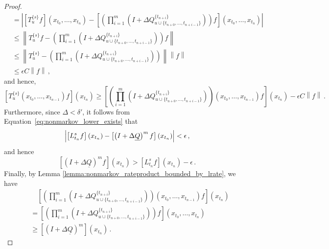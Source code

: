 \documentclass[10pt]{paper}
\newcommand{\lrate}{\underline{Q}}
\newcommand{\norm}[1]{\left\lVert #1 \right\rVert}
\begin{document}
\begin{proof}
\begin{align*}
&= \left\vert \left[T_{u}^{\{s\}}f\right](x_{t_0},\ldots,x_{t_{n}}) - \left[\left(\prod_{i=1}^m\left(I + \Delta Q_{u\cup\{t_{n+0},\ldots,t_{n+i-1}\}}^{\{t_{n+i}\}}\right)\right)f\right](x_{t_0},\ldots,x_{t_{n}})\right\vert \\
&\leq \norm{T_{u}^{\{s\}}f - \left(\prod_{i=1}^m\left(I + \Delta Q_{u\cup\{t_{n+0},\ldots,t_{n+i-1}\}}^{\{t_{n+i}\}}\right)\right)f} \\
&\leq \norm{T_{u}^{\{s\}} - \left(\prod_{i=1}^m\left(I + \Delta Q_{u\cup\{t_{n+0},\ldots,t_{n+i-1}\}}^{\{t_{n+i}\}}\right)\right)}\norm{f} \\
&\leq \epsilon C\norm{f}\,,
\end{align*}
and hence,
\begin{equation}\label{eq:nonmarkov_trans_bounded}
\left[T_u^{\{s\}}(x_{t_0},\ldots,x_{t_{n-1}})f\right](x_{t_n}) \geq \left[\left(\prod_{i=1}^m\left(I + \Delta Q_{u\cup\{t_{n+0},\ldots,t_{n+i-1}\}}^{\{t_{n+i}\}}\right)\right)(x_{t_0},\ldots,x_{t_{n-1}})f\right](x_{t_n}) - \epsilon C\norm{f}\,.
\end{equation}
Furthermore, since $\Delta<\delta'$, it follows from Equation~\eqref{eq:nonmarkov_lower_exists} that
\begin{equation*}
\Bigl\vert \left[L_{t_n}^sf\right](x_{t_n}) - \left[\left(I + \Delta\lrate\right)^mf\right](x_{t_n})\Bigr\vert < \epsilon\,,
\end{equation*}
and hence
\begin{equation}\label{eq:nonmarkov_lowerrate_bounded}
\left[\left(I+\Delta\lrate\right)^mf\right](x_{t_n}) > \left[L_{t_n}^sf\right](x_{t_n}) - \epsilon\,.
\end{equation}
Finally, by Lemma \ref{lemma:nonmarkov_rateproduct_bounded_by_lrate}, we have
\begin{align}
&\quad \left[\left(\prod_{i=1}^m\left(I + \Delta Q_{u\cup\{t_{n+0},\ldots,t_{n+i-1}\}}^{\{t_{n+i}\}}\right) \right)(x_{t_0},\ldots,x_{t_{n-1}})f\right](x_{t_n}) \\
&= \left[\left(\prod_{i=1}^m\left(I + \Delta Q_{u\cup\{t_{n+0},\ldots,t_{n+i-1}\}}^{\{t_{n+i}\}}\right) \right)f\right](x_{t_0},\ldots,x_{t_n}) \\
&\geq \left[\left(I+\Delta\lrate\right)^m\right](x_{t_n})\,.\label{eq:nonmarkov_rate_bounded}
\end{align}

\end{proof}
\end{document}
